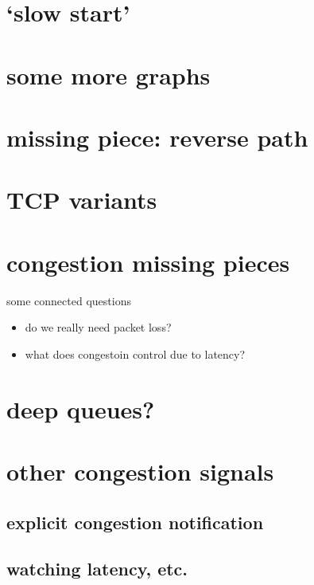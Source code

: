 \section{`slow start'}


\section{some more graphs}


\section{missing piece: reverse path}


\section{TCP variants}


\section{congestion missing pieces}
\begin{frame}{some connected questions}
    \begin{itemize}
    \item do we really need packet loss?
    \item what does congestoin control due to latency?
    \end{itemize}
\end{frame}

\section{deep queues?}


\section{other congestion signals}



\subsection{explicit congestion notification}



\subsection{watching latency, etc.}




